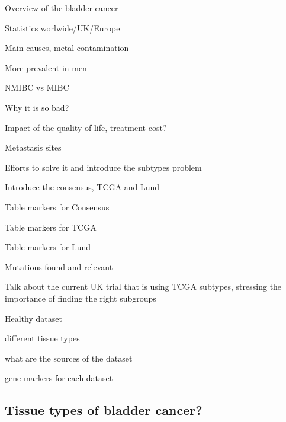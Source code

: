 \pagebreak

\begin{todolist}
    \item Overview of the bladder cancer 
    \begin{todolist}
        \item [\done] Statistics worlwide/UK/Europe
        \item [\done] Main causes, metal contamination
        \item [\done] More prevalent in men
        \item NMIBC vs MIBC
    \end{todolist}
    \item Why it is so bad? 
    \begin{todolist}
        \item [\done] Impact of the quality of life, treatment cost?
        \item Metastasis sites
    \end{todolist}
    \item Efforts to solve it and introduce the subtypes problem
    \item Introduce the consensus, TCGA and Lund
    \begin{todolist}
        \item Table markers for Consensus
        \item Table markers for TCGA
        \item Table markers for Lund
        \item Mutations found and relevant
    \end{todolist}
    \item Talk about the current UK trial that is using TCGA subtypes, stressing the importance of finding the right subgroups
    \item Healthy dataset 
    \begin{todolist}
        \item different tissue types
        \item what are the sources of the dataset
        \item gene markers for each dataset
    \end{todolist}

\end{todolist}

\subsection{Tissue types of bladder cancer?}

